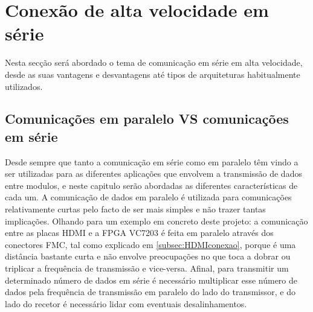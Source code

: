 \section{Conexão de alta velocidade em série} \label{sec:conexaoSerie}

Nesta secção será abordado o tema de comunicação em série em alta velocidade, desde as suas vantagens e desvantagens até tipos de arquiteturas habitualmente utilizados.

\subsection{Comunicações em paralelo VS comunicações em série}

Desde sempre que tanto a comunicação em série como em paralelo têm vindo a ser utilizadas para as diferentes aplicações que envolvem a transmissão de dados entre modulos, e neste capitulo serão abordadas as diferentes características de cada um. A comunicação de dados em paralelo é utilizada para comunicações relativamente curtas pelo facto de ser mais simples e não trazer tantas implicações. Olhando para um exemplo em concreto deste projeto: a comunicação entre as placas HDMI e a FPGA VC7203 é feita em paralelo através dos conectores FMC, tal como explicado em \ref{subsec:HDMIconexao}, porque é uma distância bastante curta e não envolve preocupações no que toca a dobrar ou triplicar a frequência de transmissão e vice-versa. Afinal, para transmitir um determinado número de dados em série é necessário multiplicar esse número de dados pela frequência de transmissão em paralelo do lado do transmissor, e do lado do recetor é necessário lidar com eventuais desalinhamentos. 

